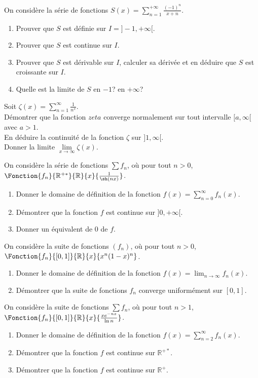 \documentclass{yann}
\begin{document}
On considère la série de fonctions $S(x)=\sum_{n=1}^{+\infty}\frac{(-1)^n}{x+n}$. 
\begin{enumerate}
\item Prouver que $S$ est définie sur $I=]-1,+\infty[$.
\item Prouver que $S$ est continue sur $I$.
\item Prouver que $S$ est dérivable sur $I$, calculer sa dérivée et en déduire que $S$ est croissante sur $I$.
\item Quelle est la limite de $S$ en $-1$? en $+\infty$?
\end{enumerate}



Soit $\zeta(x)=\sum_{n=1}^\infty \frac{1}{n^x}$.\\
Démontrer que la fonction $zeta$ converge normalement sur tout intervalle $[a,\infty[$ avec $a>1$.\\
En déduire la continuité de la fonction  $\zeta$ sur $]1,\infty[$.\\
Donner la limite $\lim\limits_{x\to \infty}\zeta(x)$.
 
 
On considère la série de fonctions $\sum f_n$, où pour tout $n>0$, $\Fonction{f_n}{\mathbb{R}^{+*}}{\mathbb{R}}{x}{\frac{1}{\sh (nx)}}$. 
\begin{enumerate}
\item Donner le domaine de définition de la fonction $f(x)=\sum_{n=0}^{\infty} f_n(x)$.
\item Démontrer que la fonction $f$ est continue sur $]0,+\infty[$.
\item Donner un équivalent de $0$ de $f$. 
\end{enumerate}



On considère la suite de fonctions $(f_n)$, où pour tout $n>0$, $\Fonction{f_n}{[0,1]}{\mathbb{R}}{x}{x^n(1-x)^n}$.  
\begin{enumerate}
\item Donner le domaine de définition de la fonction $f(x)=\lim_{n\to\infty} f_n(x)$.
\item Démontrer que la suite de fonctions $f_n$ converge uniformément sur $[0,1]$.
\end{enumerate}



On considère la suite de fonctions $\sum f_n$, où pour tout $n>1$, $\Fonction{f_n}{[0,1]}{\mathbb{R}}{x}{\frac{xe^{-nx}}{\ln n}}$.  
\begin{enumerate}
\item Donner le domaine de définition de la fonction $f(x)=\sum_{n=2}^\infty f_n(x)$.
\item Démontrer que la fonction $f$ est continue sur $\mathbb{R}^{+*}$.
\item Démontrer que la fonction $f$ est continue sur $\mathbb{R}^{+}$.
\end{enumerate}
\end{document}
